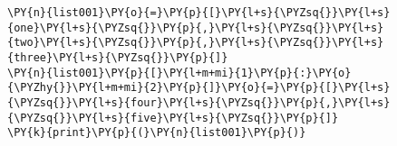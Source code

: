 \begin{Verbatim}[commandchars=\\\{\}]
\PY{n}{list001}\PY{o}{=}\PY{p}{[}\PY{l+s}{\PYZsq{}}\PY{l+s}{one}\PY{l+s}{\PYZsq{}}\PY{p}{,}\PY{l+s}{\PYZsq{}}\PY{l+s}{two}\PY{l+s}{\PYZsq{}}\PY{p}{,}\PY{l+s}{\PYZsq{}}\PY{l+s}{three}\PY{l+s}{\PYZsq{}}\PY{p}{]}
\PY{n}{list001}\PY{p}{[}\PY{l+m+mi}{1}\PY{p}{:}\PY{o}{\PYZhy{}}\PY{l+m+mi}{2}\PY{p}{]}\PY{o}{=}\PY{p}{[}\PY{l+s}{\PYZsq{}}\PY{l+s}{four}\PY{l+s}{\PYZsq{}}\PY{p}{,}\PY{l+s}{\PYZsq{}}\PY{l+s}{five}\PY{l+s}{\PYZsq{}}\PY{p}{]}
\PY{k}{print}\PY{p}{(}\PY{n}{list001}\PY{p}{)}
\end{Verbatim}
